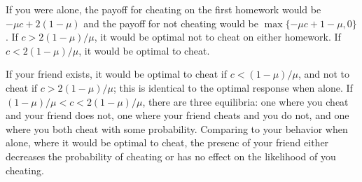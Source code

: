 \documentclass{article}
\begin{document}
If you were alone, the payoff for cheating on the first homework would be $-\mu c + 2(1 - \mu)$ and the payoff for not cheating would be $\max\{-\mu c + 1 - \mu, 0\}$. If $c > 2(1 - \mu)/\mu$, it would be optimal not to cheat on either homework. If$c < 2(1 - \mu)/\mu$, it would be optimal to cheat.

If your friend exists, it would be optimal to cheat if $c < (1 - \mu)/\mu$, and not to cheat if $c > 2(1 - \mu)/\mu$; this is identical to the optimal response when alone. If $(1 - \mu)/\mu < c < 2(1 - \mu)/\mu$, there are three equilibria: one where you cheat and your friend does not, one where your friend cheats and you do not, and one where you both cheat with some probability. Comparing to your behavior when alone, where it would be optimal to cheat, the presenc of your friend either decreases the probability of cheating or has no effect on the likelihood of you cheating.
\end{document}
